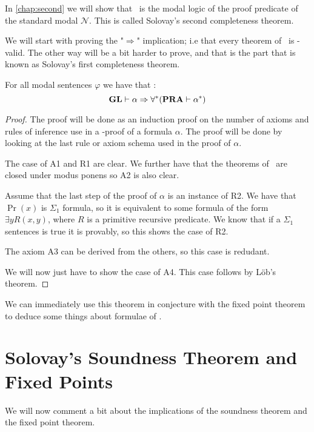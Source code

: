 \documentclass[../main.tex]{subfiles}
\begin{document}
In \ref{chap:second} we will show that \GLS\ is the modal logic of the proof
predicate of the standard modal $\mathcal{N}$. This is called Solovay's second completeness theorem.

We will start with proving the "$\Rightarrow$" implication; i.e that every
theorem of \GL\ is \PRA-valid. The other way will be a bit harder to prove, and
that is the part that is known as Solovay's first completeness theorem.
\begin{thm}[Soundness]
	For all modal sentences $\varphi$ we have that :
	$$\text{\textbf{GL}}\vdash\alpha\Rightarrow\forall ^*(\text{\textbf{PRA}}\vdash\alpha^*)$$
\end{thm}
\begin{proof}
	The proof will be done as an induction proof on the number of axioms
	and rules of inference use in a \GL-proof of a formula $\alpha$. The
	proof will be done by looking at the last rule or axiom schema used in
	the proof of $\alpha$.

	The case of A1 and R1 are clear. We further have that the theorems of
	\PRA\ are closed under modus ponens so A2 is also clear. 

	Assume that  the last step of the proof of $\alpha$ is an instance of
	R2. We have that $\Pr(x)$ is $\Sigma_1$ formula, so it is equivalent to
	some formula of the form $\exists y R(x,y)$, where $R$ is a primitive
	recursive predicate. We know that if a $\Sigma_1$ sentences is true it
	is provably, so this shows the case of R2.

	The axiom A3 can be derived from the others, so this case is redudant.

	We will now just have to show the case of A4. This case follows by
	Löb's theorem.
\end{proof}
We can immediately use this theorem in conjecture with the fixed point theorem
to deduce some things about formulae of \PRA.
\section{Solovay's Soundness Theorem and Fixed Points}

We will now comment a bit about the implications of the soundness theorem and
the fixed point theorem.
\end{document}
